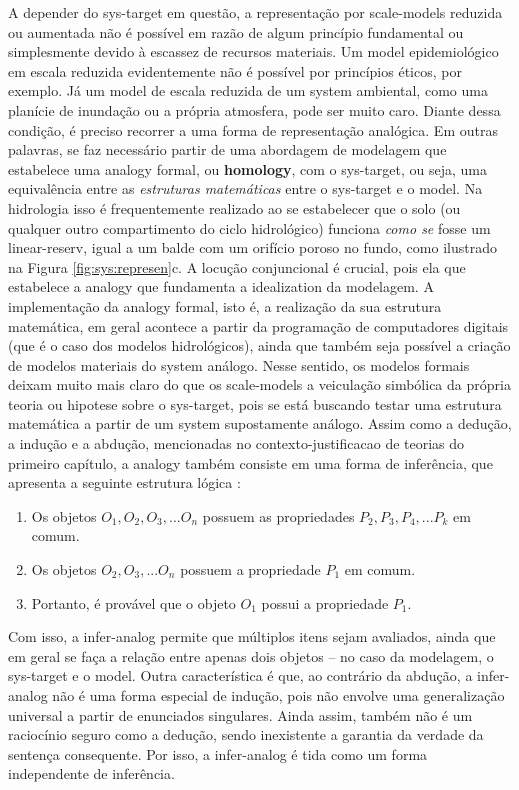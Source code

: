 \documentclass[./main.tex]{subfiles}
\begin{document}
\par A depender do \gls{sys-target} em questão, a representação por \gls{scale-models} reduzida ou aumentada não é possível em razão de algum princípio fundamental ou simplesmente devido à escassez de recursos materiais. Um \gls{model} epidemiológico em escala reduzida evidentemente não é possível por princípios éticos, por exemplo. Já um \gls{model} de escala reduzida de um \gls{system} ambiental, como uma planície de inundação ou a própria atmosfera, pode ser muito caro. Diante dessa condição, é preciso recorrer a uma forma de representação analógica. Em outras palavras, se faz necessário partir de uma abordagem de modelagem que estabelece uma \gls{analogy} formal, ou \textbf{\gls{homology}}, com o \gls{sys-target}, ou seja, uma equivalência entre as \textit{estruturas matemáticas} entre o \gls{sys-target} e o \gls{model}. Na hidrologia isso é frequentemente realizado ao se estabelecer que o solo (ou qualquer outro compartimento do ciclo hidrológico) funciona \textit{como se} fosse um \gls{linear-reserv}, igual a um balde com um orifício poroso no fundo, como ilustrado na Figura \ref{fig:sys:represen}c. A locução conjuncional  é crucial, pois ela que estabelece a \gls{analogy} que fundamenta a \gls{idealization} da modelagem. A implementação da \gls{analogy} formal, isto é, a realização da sua estrutura matemática, em geral acontece a partir da programação de computadores digitais (que é o caso dos modelos hidrológicos), ainda que também seja possível a criação de modelos materiais do \gls{system} análogo. Nesse sentido, os modelos formais deixam muito mais claro do que os \gls{scale-models} a veiculação simbólica da própria \gls{teoria} ou \gls{hipotese} sobre o \gls{sys-target}, pois se está buscando testar uma estrutura matemática a partir de um \gls{system} supostamente análogo. Assim como a dedução, a indução e a abdução, mencionadas no \gls{contexto-justificacao} de teorias do primeiro capítulo, a \gls{analogy} também consiste em uma forma de inferência, que apresenta a seguinte estrutura lógica \cite{shaw_ashley_1983}:
\begin{enumerate}
    \item Os objetos $O_1, O_2, O_3, ... O_n$ possuem as propriedades $P_2, P_3, P_4, ... P_k$ em comum. 
    \item Os objetos $O_2, O_3, ... O_n$ possuem a propriedade $P_1$ em comum. \\
    \item Portanto, é provável que o objeto $O_1$ possui a propriedade $P_1$.
\end{enumerate}
Com isso, a \gls{infer-analog} permite que múltiplos itens sejam avaliados, ainda que em geral se faça a relação entre apenas dois objetos – no caso da modelagem, o \gls{sys-target} e o \gls{model}. Outra característica é que, ao contrário da abdução, a \gls{infer-analog} não é uma forma especial de indução, pois não envolve uma generalização universal a partir de enunciados singulares. Ainda assim, também não é um raciocínio seguro como a dedução, sendo inexistente a garantia da verdade da sentença consequente. Por isso, a \gls{infer-analog} é tida como um forma independente de inferência.
\end{document}
